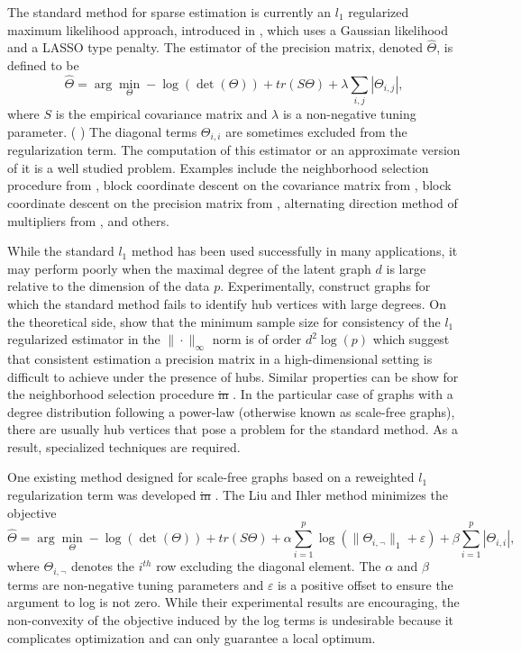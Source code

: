 \documentclass{uwstat572}
\newcommand{\vmdel}[1]{\sout{#1}}
\newcommand{\vmadd}[1]{\textbf{\color{red}{#1}}}
\newcommand{\vmcomment}[1]{({\color{blue}{VM's comment:}} \textbf{\color{blue}{#1}})}
\theoremstyle{remark}
\theoremstyle{definition}
\begin{document}
The standard method for sparse estimation \vmadd{of a Gaussian precision matrix} is currently an $l_1$ regularized maximum likelihood approach, introduced in \cite{Yuan2007}, which uses a Gaussian likelihood and a LASSO type penalty.  The estimator of the precision matrix, denoted $\widehat{\Theta}$, is defined to be
\begin{equation*}
    \widehat{\Theta} = \arg\min_{\Theta} -\log( \det( \Theta)) + tr(S \Theta) + \lambda \sum_{i, j} |\Theta_{i,j}|,
\end{equation*}
where $S$ is the empirical covariance matrix and $\lambda$ is a non-negative tuning parameter. 
\vmcomment{All matrices and vectors need to be bolded.}
The diagonal terms $\Theta_{i,i}$ are sometimes excluded from the regularization term. The computation of this estimator or an approximate version of it is a well studied problem.  Examples include the neighborhood selection procedure from \cite{meinshausen2006}, block coordinate descent on the covariance matrix from \cite{Banerjee2008}, block coordinate descent on the precision matrix from \cite{Friedman2008}, alternating direction method of multipliers from \cite{Boyd2011}, and others.

While the standard $l_1$ method has been used successfully in many applications, it may perform poorly when the maximal degree of the latent graph $d$ is large relative to the dimension of the data $p$. Experimentally, \cite{Schaefer2005} construct graphs for which the standard method fails to identify hub vertices with large degrees. 
On the theoretical side, \cite{ravikumar2011} show that the minimum sample size for consistency of the $l_1$ regularized estimator in the $\| \cdot \|_{\infty}$ norm is of order $d^2 \log(p)$\vmadd{,} which suggest\vmadd{s} that consistent estimation \vmadd{of} a precision matrix in a high-dimensional setting is difficult to achieve under the presence of hubs. 
Similar properties can be show\vmadd{n} for the neighborhood selection procedure \vmdel{in} \vmadd{of} \cite{meinshausen2006}.  In the particular case of graphs with a degree distribution following a power-law (otherwise known as scale-free graphs), there are usually hub vertices that pose a problem for the standard method.  As a result, specialized techniques are required.

One existing method designed for scale-free graphs based on a reweighted $l_1$ regularization term was developed \vmdel{in} \vmadd{by} \cite{liu11c}.  The Liu and Ihler method minimizes the objective
\begin{equation*}
    \widehat{\Theta} = \arg\min_{\Theta}  -\log( \det( \Theta)) + tr(S \Theta) + \alpha \sum_{i=1}^p \log( \| \Theta_{i,\neg}\|_1 + \varepsilon ) + \beta \sum_{i=1}^p |\Theta_{i,i}|,
\end{equation*}
where $\Theta_{i,\neg}$ denotes the $i^{th}$ row excluding the diagonal element.  The $\alpha$ and $\beta$ terms are non-negative tuning parameters and $\varepsilon$ is a positive offset to ensure the argument to log is not zero. While their experimental results are encouraging, the non-convexity of the objective induced by the log terms is undesirable because it complicates optimization and can only guarantee a local optimum.
\end{document}
